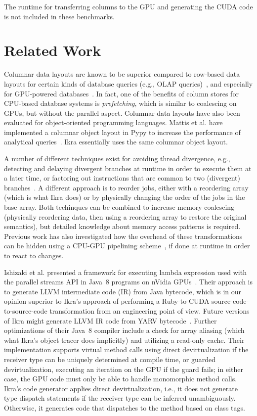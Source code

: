 \documentclass[preprint]{sigplanconf}
\begin{document}
The runtime for transferring columns to the GPU and generating the CUDA code is not included in these benchmarks.

\section{Related Work}
Columnar data layouts are known to be superior compared to row-based data layouts for certain kinds of database queries (e.g., OLAP queries)~\cite{Plattner:2009:CDA:1559845.1559846}, and especially for GPU-powered databases~\cite{Bakkum:2010:ASD:1735688.1735706}. In fact, one of the benefits of column stores for CPU-based database systems is \emph{prefetching}, which is similar to coalescing on GPUs, but without the parallel aspect. Columnar data layouts have also been evaluated for object-oriented programming languages. Mattis et al. have implemented a columnar object layout in Pypy to increase the performance of analytical queries~\cite{Mattis:2015:COI:2814228.2814230}. Ikra essentially uses the same columnar object layout.

A number of different techniques exist for avoiding thread divergence, e.g., detecting and delaying divergent branches at runtime in order to execute them at a later time, or factoring out instructions that are common to two (divergent) branches~\cite{Han:2011:RBD:1964179.1964184}. A different approach is to reorder jobs, either with a reordering array (which is what Ikra does) or by physically changing the order of the jobs in the base array. Both techinques can be combined to increase memory coalescing~\cite{Zhang:2011:OED:1950365.1950408} (physically reordering data, then using a reordering array to restore the original semantics), but detailed knowledge about memory access patterns is required. Previous work has also investigated how the overhead of these transformations can be hidden using a CPU-GPU pipelining scheme~\cite{Zhang:2010:SGA:1810085.1810104}, if done at runtime in order to react to changes.

Ishizaki et al. presented a framework for executing lambda expression used with the parallel streams API in Java~8 programs on nVidia GPUs~\cite{ishizaki2015compiling}. Their approach is to generate LLVM intermediate code (IR) from Java bytecode, which is in our opinion superior to Ikra's approach of performing a Ruby-to-CUDA source-code-to-source-code transformation from an engineering point of view. Future versions of Ikra might generate LLVM IR code from YARV bytecode~\cite{Sasada:2005:YYR:1094855.1094912}. Further optimizations of their Java~8 compiler include a check for array aliasing (which what Ikra's object tracer does implicitly) and utilizing a read-only cache. Their implementation supports virtual method calls using direct devirtualization if the receiver type can be uniquely determined at compile time, or guarded devirtualization, executing an iteration on the GPU if the guard fails; in either case, the GPU code must only be able to handle monomorphic method calls. Ikra's code generator applies direct devirtualization, i.e., it does not generate type dispatch statements if the receiver type can be inferred unambiguously. Otherwise, it generates code that dispatches to the method based on class tags.
\end{document}
